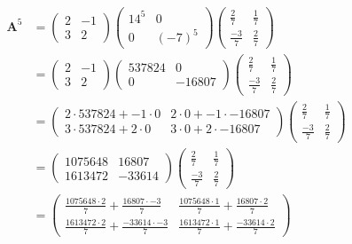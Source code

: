 \documentclass{tufte-handout}
\begin{document}
\begin{question}
\begin{align*}
\mathbf{A}^5 &= \begin{pmatrix}
  2 & -1\\
  3 & 2 
\end{pmatrix}
\begin{pmatrix}
  14^5 & 0\\
  0 & (-7)^5
\end{pmatrix}
\begin{pmatrix}
  \frac{2}{7} & \frac{1}{7}\\
  \frac{-3}{7} & \frac{2}{7}
\end{pmatrix} \\[8pt]
&= \begin{pmatrix}
  2 & -1\\
  3 & 2 
\end{pmatrix}
\begin{pmatrix}
  537824 & 0\\
  0 & -16807
\end{pmatrix}
\begin{pmatrix}
  \frac{2}{7} & \frac{1}{7}\\
  \frac{-3}{7} & \frac{2}{7}
\end{pmatrix} \\[8pt]
&= \begin{pmatrix}
  2 \cdot 537824 + -1 \cdot 0 & 2 \cdot 0 + -1 \cdot -16807\\
  3 \cdot 537824 + 2 \cdot 0 & 3 \cdot 0 + 2 \cdot -16807
\end{pmatrix}
\begin{pmatrix}
  \frac{2}{7} & \frac{1}{7}\\
  \frac{-3}{7} & \frac{2}{7}
\end{pmatrix} \\[8pt]
&= \begin{pmatrix}
  1075648 & 16807\\
  1613472 & -33614
\end{pmatrix}
\begin{pmatrix}
  \frac{2}{7} & \frac{1}{7}\\
  \frac{-3}{7} & \frac{2}{7}
\end{pmatrix} \\[8pt]
&= \begin{pmatrix}
  \frac{1075648 \cdot 2}{7} + \frac{16807 \cdot -3}{7} & \frac{1075648 \cdot 1}{7} + \frac{16807 \cdot 2}{7}\\
  \frac{1613472 \cdot 2}{7} + \frac{-33614 \cdot -3}{7} & \frac{1613472 \cdot 1}{7} + \frac{-33614 \cdot 2}{7}  
\end{pmatrix} \\[8pt]

\end{align*}
\end{question}
\end{document}
